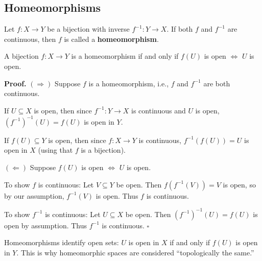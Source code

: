 \documentclass[11pt]{report}
\renewenvironment{proof}[1][Proof]{\noindent\textbf{#1.} }{\hfill$\square$\par\vspace{5pt}}
\begin{document}
\subsection{Homeomorphisms}

\begin{defbox}[Homeomorphism]
Let $f: X \to Y$ be a bijection with inverse $f^{-1}: Y \to X$. If both $f$ and $f^{-1}$ are continuous, then $f$ is called a \textbf{homeomorphism}.
\end{defbox}

\begin{propbox}
A bijection $f: X \to Y$ is a homeomorphism if and only if $f(U)$ is open $\Leftrightarrow$ $U$ is open.
\end{propbox}

\begin{proof}
$(\Rightarrow)$ Suppose $f$ is a homeomorphism, i.e., $f$ and $f^{-1}$ are both continuous.

If $U \subseteq X$ is open, then since $f^{-1}: Y \to X$ is continuous and $U$ is open, $(f^{-1})^{-1}(U) = f(U)$ is open in $Y$.

If $f(U) \subseteq Y$ is open, then since $f: X \to Y$ is continuous, $f^{-1}(f(U)) = U$ is open in $X$ (using that $f$ is a bijection).

$(\Leftarrow)$ Suppose $f(U)$ is open $\Leftrightarrow$ $U$ is open.

To show $f$ is continuous: Let $V \subseteq Y$ be open. Then $f(f^{-1}(V)) = V$ is open, so by our assumption, $f^{-1}(V)$ is open. Thus $f$ is continuous.

To show $f^{-1}$ is continuous: Let $U \subseteq X$ be open. Then $(f^{-1})^{-1}(U) = f(U)$ is open by assumption. Thus $f^{-1}$ is continuous.
\end{proof}

\begin{rembox}
Homeomorphisms identify open sets: $U$ is open in $X$ if and only if $f(U)$ is open in $Y$. This is why homeomorphic spaces are considered ``topologically the same.''
\end{rembox}
\end{document}
